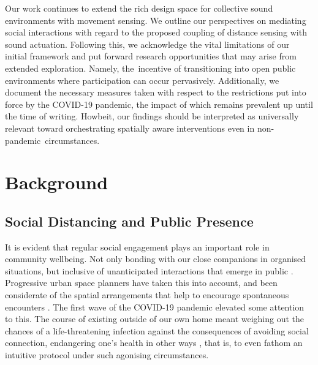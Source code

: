 Our work continues to extend the rich design space for collective sound environments with movement sensing. We outline our perspectives on mediating social interactions with regard to the proposed coupling of distance sensing with sound actuation. Following this, we acknowledge the vital limitations of our initial framework and put forward research opportunities that may arise from extended exploration. Namely, the~incentive of transitioning into open public environments where participation can occur pervasively. Additionally, we document the necessary measures taken with respect to the restrictions put into force by the COVID-19 pandemic, the impact of which remains prevalent up until the time of writing. Howbeit, our findings should be interpreted as universally relevant toward orchestrating spatially aware interventions even in non-pandemic~circumstances.

\section{Background}
\label{sec2:Background}

\subsection*{Social Distancing and Public Presence}
\label{subsec:public_space}

It is evident that regular social engagement plays an important role in community wellbeing. Not only bonding with our close companions in organised situations, but inclusive of unanticipated interactions that emerge in public \citep{ang_your_2021,simoes_aelbrecht_rethinking_2010,sugiyama_associations_2008}. Progressive urban space planners have taken this into account, and been considerate of the spatial arrangements that help to encourage spontaneous encounters \citep{latham_social_2019,okkels_urban_2018,mehta_look_2009}. The first wave of the COVID-19 pandemic elevated some attention to this. The course of existing outside of our own home meant weighing out the chances of a life-threatening infection against the consequences of avoiding social connection, endangering one's health in other ways \citep{brooks_psychological_2020,rivera_effects_2020,zorzo_adult_2019,evans_social_2019}, that is, to even fathom an intuitive protocol under such agonising circumstances.


